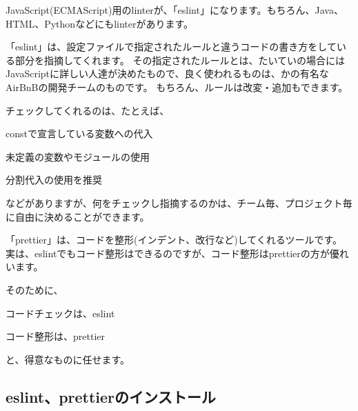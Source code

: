 \vspace*{\baselineskip}

JavaScript(ECMAScript)用のlinterが、「eslint」になります。もちろん、Java、HTML、Pythonなどにもlinterがあります。

\vspace*{\baselineskip}

「eslint」は、設定ファイルで指定されたルールと違うコードの書き方をしている部分を指摘してくれます。
その指定されたルールとは、たいていの場合にはJavaScriptに詳しい人達が決めたもので、良く使われるものは、かの有名なAirBnBの開発チームのものです。
もちろん、ルールは改変・追加もできます。

\vspace*{\baselineskip}

チェックしてくれるのは、たとえば、\\[0pt]

\begin{starteritemize}
\item constで宣言している変数への代入
\item 未定義の変数やモジュールの使用
\item 分割代入の使用を推奨
\end{starteritemize}

\vspace*{\baselineskip}

などがありますが、何をチェックし指摘するのかは、チーム毎、プロジェクト毎に自由に決めることができます。

\vspace*{\baselineskip}

「prettier」は、コードを整形(インデント、改行など)してくれるツールです。
実は、eslintでもコード整形はできるのですが、コード整形はprettierの方が優れいます。

\vspace*{\baselineskip}

そのために、\\[0pt]

\begin{starteritemize}
\item コードチェックは、eslint
\item コード整形は、prettier
\end{starteritemize}

\vspace*{\baselineskip}

と、得意なものに任せます。

\subsection{eslint、prettierのインストール}
\keeplastskip{
  \label{sec:2-3-1}
  \label{sec-03eslint}
  \par\nobreak
}

